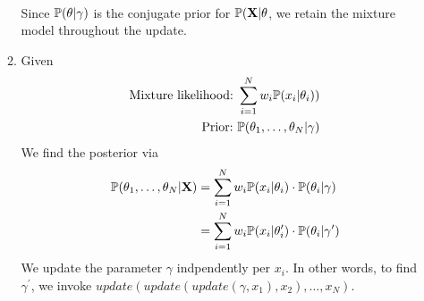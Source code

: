\documentclass{article}
\begin{document}
\begin{enumerate}
\begin{enumerate}
\begin{align*}
              \end{align*}
              Since \(\mathbb{P}(\theta|\gamma)\) is the conjugate prior for 
              \(\mathbb{P}(\mathbf{X}|\theta\), we retain the mixture model 
              throughout the update.
            \item %
              Given
              \begin{align*}
                \textnormal{Mixture likelihood:\ } \sum_{i=1}^N w_i\mathbb{P}(x_i | \theta_i)) \\
                \textnormal{Prior:\ } \mathbb{P}(\theta_1,\hdots,\theta_N|\gamma)
              \end{align*}
              We find the posterior via
              \begin{align*}
                \mathbb{P}(\theta_1,\hdots,\theta_N|\mathbf{X})
                &=  \sum_{i=1}^N w_i\mathbb{P}(x_i | \theta_i)\cdot\mathbb{P}(\theta_i|\gamma) \\
                &=  \sum_{i=1}^N w_i\mathbb{P}(x_i | \theta_i^{\prime})\cdot\mathbb{P}(\theta_i|\gamma^{\prime})
              \end{align*}
              We update the parameter \(\gamma\) indpendently per \(x_i\). In other words, to
              find \(\gamma^{\prime}\), we invoke \(update(update(update(\gamma,x_1),x_2),\hdots,x_N)\).
              

\end{enumerate}
\end{enumerate}
\end{document}
